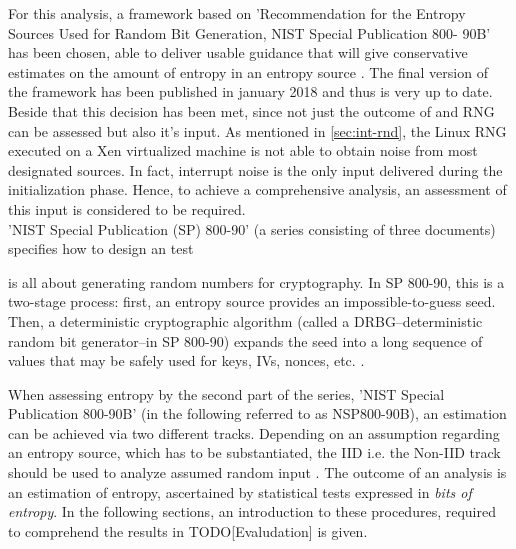For this analysis, a framework based on 'Recommendation for the Entropy Sources Used for Random Bit Generation, NIST Special Publication 800- 90B' \cite{turan2018nist} has been chosen, able to deliver
usable guidance that will give conservative estimates on the amount of entropy in an entropy
source \cite{turan2015random}. The final version of the framework has been published in january 2018 and thus is very up to date. Beside that this decision has been met, since not just the outcome of and RNG can be assessed but also it's input. As mentioned in \ref{sec:int-rnd}, the Linux RNG executed on a Xen virtualized machine is not able to obtain noise from most designated sources. In fact, interrupt noise is the only input delivered during the initialization phase. Hence, to achieve a comprehensive analysis, an assessment of this input is considered to be required.\\
'NIST Special Publication (SP) 800-90' (a series consisting of three documents) specifies how to design an test 

 is all about
generating random numbers for cryptography. In SP 800-90, this is a two-stage process: first, an
entropy source provides an impossible-to-guess seed. Then, a deterministic cryptographic
algorithm (called a DRBG--deterministic random bit generator--in SP 800-90) expands the seed
into a long sequence of values that may be safely used for keys, IVs, nonces, etc.
\cite{turan2015random}.



 When assessing entropy by the second part of the series, 'NIST Special Publication 800-90B' (in the following referred to as NSP800-90B), an estimation can be achieved via 
two different tracks. Depending on an assumption regarding an entropy source, which has to be substantiated, the IID i.e. the Non-IID track should be used to analyze assumed random input 
\cite{turan2018nist}. The outcome of an analysis is an estimation of entropy, ascertained by statistical tests expressed in \textit{bits of entropy}. In the following sections, an introduction to these procedures, required to comprehend the results in TODO[Evaludation] is given.




